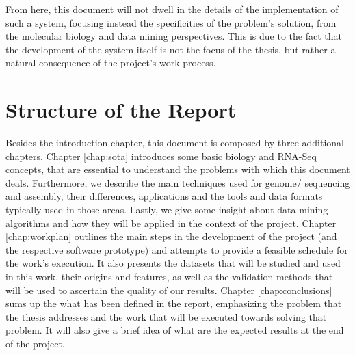 From here, this document will not dwell in the details of the implementation of
such a system, focusing instead the specificities of the problem's solution,
from the molecular biology and data mining perspectives. This is due to the fact
that the development of the system itself is not the focus of the thesis, but
rather a natural consequence of the project's work process.

\section{Structure of the Report} \label{sec:outline}

Besides the introduction chapter, this document is composed by three additional
chapters. Chapter \ref{chap:sota} introduces some basic biology and RNA-Seq
concepts, that are essential to understand the problems with which this document
deals. Furthermore, we describe the main techniques used for genome/\trans{}
sequencing and assembly, their differences, applications and the tools and data
formats typically used in those areas. Lastly, we give some insight about data
mining algorithms and how they will be applied in the context of the project.
Chapter \ref{chap:workplan} outlines the main steps in the development of the
project (and the respective software prototype) and attempts to provide a
feasible schedule for the work's execution. It also presents the datasets that
will be studied and used in this work, their origins and features, as well as
the validation methods that will be used to ascertain the quality of our
results. Chapter \ref{chap:conclusions} sums up the what has been defined in the
report, emphasizing the problem that the thesis addresses and the work that will
be executed towards solving that problem. It will also give a brief idea of what
are the expected results at the end of the project.
